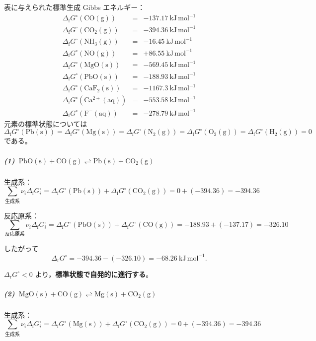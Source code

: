 \documentclass[a4paper,12pt]{jlreq}
\begin{document}
表に与えられた標準生成 Gibbs エネルギー：
\[
\begin{array}{lcl}
\Delta_{\mathrm f}G^\circ(\mathrm{CO(g)}) &=& -137.17\ \mathrm{kJ\,mol^{-1}}\\
\Delta_{\mathrm f}G^\circ(\mathrm{CO_2(g)}) &=& -394.36\ \mathrm{kJ\,mol^{-1}}\\
\Delta_{\mathrm f}G^\circ(\mathrm{NH_3(g)}) &=& -16.45\ \mathrm{kJ\,mol^{-1}}\\
\Delta_{\mathrm f}G^\circ(\mathrm{NO(g)})  &=& +86.55\ \mathrm{kJ\,mol^{-1}}\\
\Delta_{\mathrm f}G^\circ(\mathrm{MgO(s)}) &=& -569.45\ \mathrm{kJ\,mol^{-1}}\\[2mm]
\Delta_{\mathrm f}G^\circ(\mathrm{PbO(s)}) &=& -188.93\ \mathrm{kJ\,mol^{-1}}\\
\Delta_{\mathrm f}G^\circ(\mathrm{CaF_2(s)}) &=& -1167.3\ \mathrm{kJ\,mol^{-1}}\\
\Delta_{\mathrm f}G^\circ(\mathrm{Ca^{2+}(aq)}) &=& -553.58\ \mathrm{kJ\,mol^{-1}}\\
\Delta_{\mathrm f}G^\circ(\mathrm{F^-(aq)}) &=& -278.79\ \mathrm{kJ\,mol^{-1}}
\end{array}
\]
元素の標準状態については
\[
\Delta_{\mathrm f}G^\circ(\mathrm{Pb(s)}) =
\Delta_{\mathrm f}G^\circ(\mathrm{Mg(s)}) =
\Delta_{\mathrm f}G^\circ(\mathrm{N_2(g)}) =
\Delta_{\mathrm f}G^\circ(\mathrm{O_2(g)}) =
\Delta_{\mathrm f}G^\circ(\mathrm{H_2(g)}) = 0
\]
である。

\subparagraph{(1)\ $\mathrm{PbO(s)+CO(g)\rightleftharpoons Pb(s)+CO_2(g)}$}

生成系：
\[
\sum_{\text{生成系}} \nu_i \Delta_{\mathrm f}G_i^\circ
= \Delta_{\mathrm f}G^\circ(\mathrm{Pb(s)}) + \Delta_{\mathrm f}G^\circ(\mathrm{CO_2(g)})
= 0 + (-394.36)
= -394.36
\]

反応原系：
\[
\sum_{\text{反応原系}} \nu_i \Delta_{\mathrm f}G_i^\circ
= \Delta_{\mathrm f}G^\circ(\mathrm{PbO(s)}) + \Delta_{\mathrm f}G^\circ(\mathrm{CO(g)})
= -188.93 + (-137.17)
= -326.10
\]

したがって
\[
\Delta_{\mathrm r}G^\circ
= -394.36 - (-326.10)
= -68.26\ \mathrm{kJ\,mol^{-1}}.
\]

$\Delta_{\mathrm r}G^\circ<0$ より，\textbf{標準状態で自発的に進行する}。

\subparagraph{(2)\ $\mathrm{MgO(s)+CO(g)\rightleftharpoons Mg(s)+CO_2(g)}$}

生成系：
\[
\sum_{\text{生成系}} \nu_i \Delta_{\mathrm f}G_i^\circ
= \Delta_{\mathrm f}G^\circ(\mathrm{Mg(s)}) + \Delta_{\mathrm f}G^\circ(\mathrm{CO_2(g)})
= 0 + (-394.36)
= -394.36
\]
\end{document}
